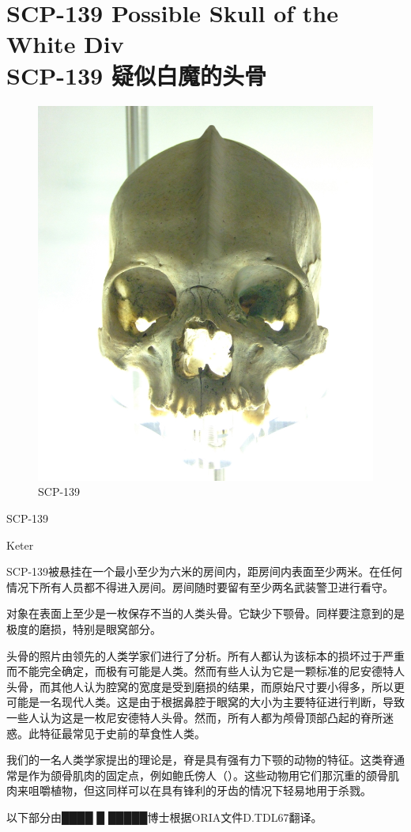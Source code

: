 \chapter[SCP-139 疑似白魔的头骨]{
    SCP-139 Possible Skull of the White Div\\
    SCP-139 疑似白魔的头骨
}

\label{chap:SCP-139}

\begin{figure}[H]
    \centering
    \includegraphics[width=0.5\linewidth]{images/SCP-139.jpg}
    \caption*{SCP-139}
\end{figure}

SCP-139

Keter

SCP-139被悬挂在一个最小至少为六米的房间内，距房间内表面至少两米。在任何情况下所有人员都不得进入房间。房间随时要留有至少两名武装警卫进行看守。

对象在表面上至少是一枚保存不当的人类头骨。它缺少下颚骨。同样要注意到的是极度的磨损，特别是眼窝部分。

头骨的照片由领先的人类学家们进行了分析。所有人都认为该标本的损坏过于严重而不能完全确定，而极有可能是人类。然而有些人认为它是一颗标准的尼安德特人头骨，而其他人认为腔窝的宽度是受到磨损的结果，而原始尺寸要小得多，所以更可能是一名现代人类。这是由于根据鼻腔于眼窝的大小为主要特征进行判断，导致一些人认为这是一枚尼安德特人头骨。然而，所有人都为颅骨顶部凸起的脊所迷惑。此特征最常见于史前的草食性人类。

我们的一名人类学家提出的理论是，脊是具有强有力下颚的动物的特征。这类脊通常是作为颌骨肌肉的固定点，例如鲍氏傍人（）。这些动物用它们那沉重的颌骨肌肉来咀嚼植物，但这同样可以在具有锋利的牙齿的情况下轻易地用于杀戮。

以下部分由████ █ █████博士根据ORIA文件D.TDL67翻译。

